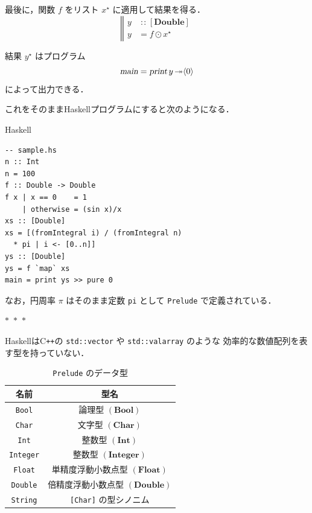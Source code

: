 \documentclass[a5paper,twoside,fleqn,draft]{jsbook}
\newcommand{\separator}{\begin{center}$*$~$*$~$*$\end{center}}
\newcommand{\programminglanguage}[1]{\textsf{#1}}
\newcommand{\cxx}{\programminglanguage{C}\texttt{++}}
\newcommand{\haskell}{\programminglanguage{Haskell}}
\newcommand{\code}[1]{\texttt{#1}}
\newcommand{\filename}[1]{\texttt{#1}}
\newenvironment{haskellcode}{\begin{itembox}[r]{\haskell}}{\end{itembox}}
\newcommand{\mBrace}{\Vert}
\newcommand{\mAction}[1]{\textsl{#1}}
\DeclareMathOperator{\mMain}{\mAction{main}}
\DeclareMathOperator{\mPrint}{\mAction{print}}
\DeclareMathOperator{\mBindRightIgnore}{\twoheadrightarrow}
\DeclareMathOperator{\mIn}{{:\!:}}
\DeclareMathOperator{\mMapList}{\odot}
\newcommand{\mType}[1]{\mathbf{#1}}
\newcommand{\mBoolType}{\mType{Bool}}
\newcommand{\mCharType}{\mType{Char}}
\newcommand{\mFloatType}{\mType{Float}}
\newcommand{\mDoubleType}{\mType{Double}}
\newcommand{\mIntType}{\mType{Int}}
\newcommand{\mIntegerType}{\mType{Integer}}
\newcommand{\mListType}[1]{[\mType{#1}]}
\newcommand{\mPureWith}[1]{\langle#1\rangle}
\newcommand{\mList}[1]{{#1}^\mathrm{\star}}
\begin{document}
最後に，関数 $f$ をリスト $\mList{x}$ に適用して結果を得る．
\begin{equation}
\left\mBrace
\begin{aligned}
y&\mIn{}\mListType{\mDoubleType}\\
y&=f\mMapList\mList{x}
\end{aligned}
\right.
\end{equation}

結果 $\mList{y}$ はプログラム
\begin{equation}
\mMain=\mPrint y\mBindRightIgnore\mPureWith{0}
\end{equation}
によって出力できる．

これをそのまま\haskell プログラムにすると次のようになる．
\begin{haskellcode}
\begin{verbatim}
-- sample.hs
n :: Int
n = 100
f :: Double -> Double
f x | x == 0    = 1
    | otherwise = (sin x)/x
xs :: [Double]
xs = [(fromIntegral i) / (fromIntegral n)
  * pi | i <- [0..n]]
ys :: [Double]
ys = f `map` xs
main = print ys >> pure 0
\end{verbatim}
\end{haskellcode}

なお，円周率 $\pi$ はそのまま定数 \code{pi} として \filename{Prelude}
で定義されている．

\separator

\haskell は\cxx の \code{std::vector} や \code{std::valarray} のような
効率的な数値配列を表す型を持っていない．

\begin{table}
\caption{\filename{Prelude} のデータ型}
\label{tab:data-types}
\begin{center}
\begin{tabular}{||c|c||}
\hline
名前&型名\\
\hline\hline
\code{Bool}&論理型 $(\mBoolType)$\\
\code{Char}&文字型 $(\mCharType)$\\
\code{Int}&整数型 $(\mIntType)$\\
\code{Integer}&整数型 $(\mIntegerType)$\\
\code{Float}&単精度浮動小数点型 $(\mFloatType)$\\
\code{Double}&倍精度浮動小数点型 $(\mDoubleType)$\\
\code{String}&\code{[Char]} の型シノニム\\
\hline
\end{tabular}
\end{center}
\end{table}
\end{document}
